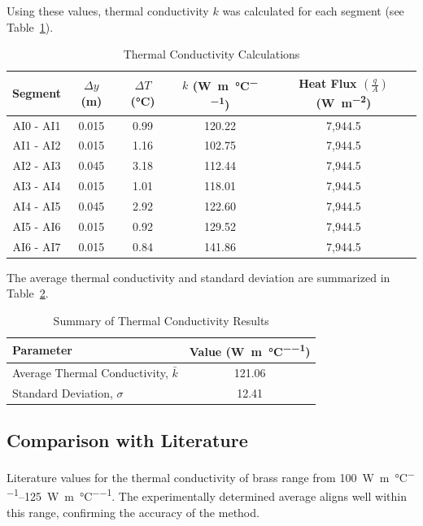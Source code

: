 \documentclass[12pt]{article}
\begin{document}
Using these values, thermal conductivity $k$ was calculated for each segment (see Table~\ref{tab:k_values}).

\begin{table}[H]
    \centering
    \caption{Thermal Conductivity Calculations}
    \label{tab:k_values}
    \begin{tabular}{ccccc}
        \toprule
        Segment & $\Delta y$ (m) & $\Delta T$ (\si{\celsius}) & $k$ (\si{\watt\per\meter\per\celsius}) & Heat Flux $\left( \frac{q}{A} \right)$ (\si{\watt\per\meter\squared}) \\
        \midrule
        AI0 - AI1 & 0.015 & 0.99  & 120.22 & 7,944.5 \\
        AI1 - AI2 & 0.015 & 1.16  & 102.75 & 7,944.5 \\
        AI2 - AI3 & 0.045 & 3.18  & 112.44 & 7,944.5 \\
        AI3 - AI4 & 0.015 & 1.01  & 118.01 & 7,944.5 \\
        AI4 - AI5 & 0.045 & 2.92  & 122.60 & 7,944.5 \\
        AI5 - AI6 & 0.015 & 0.92  & 129.52 & 7,944.5 \\
        AI6 - AI7 & 0.015 & 0.84  & 141.86 & 7,944.5 \\
        \bottomrule
    \end{tabular}
\end{table}

The average thermal conductivity and standard deviation are summarized in Table~\ref{tab:summary_statistics}.

\begin{table}[H]
    \centering
    \caption{Summary of Thermal Conductivity Results}
    \label{tab:summary_statistics}
    \begin{tabular}{lc}
        \toprule
        Parameter & Value (\si{\watt\per\meter\per\celsius}) \\
        \midrule
        Average Thermal Conductivity, $\bar{k}$ & 121.06 \\
        Standard Deviation, $\sigma$ & 12.41 \\
        \bottomrule
    \end{tabular}
\end{table}

\subsection{Comparison with Literature}

Literature values for the thermal conductivity of brass range from \SIrange{100}{125}{\watt\per\meter\per\celsius}. The experimentally determined average aligns well within this range, confirming the accuracy of the method.
\end{document}
